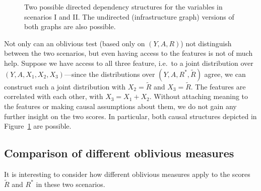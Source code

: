 \begin{figure}
\centering
  \qquad \qquad  \qquad

    \caption{Two possible directed dependency structures for the
      variables in scenarios I and II.  The undirected (infrastructure
      graph) versions of both graphs are also possible.}\label{fig:twooptions}
\end{figure}
Not only can an oblivious test (based only on $(Y,A,R)$) not
distinguish between the two scenarios, but even having access to the
features is not of much help.  Suppose we have access to all three
feature, i.e.~to a joint distribution over $(Y,A,X_1,X_2,X_3)$---since
the distributions over $(Y,A,R^*,\tilde{R})$ agree, we can construct
such a joint distribution with $X_2=\tilde{R}$ and $X_3=\tilde{R}$.
The features are correlated with each other, with $X_3=X_1+X_2$.
Without attaching meaning to the features or making causal assumptions
about them, we do not gain any further insight on the two scores.  In
particular, both causal structures depicted in Figure~\ref{fig:twooptions} are
possible.


\subsection{Comparison of different oblivious measures}
%
It is interesting to consider how different oblivious measures apply
to the scores $\tilde{R}$ and $R^*$ in these two scenarios.

